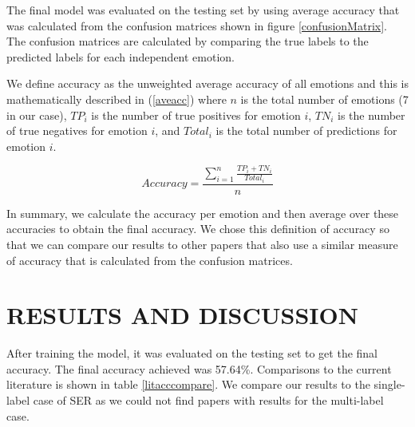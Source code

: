\documentclass[a4paper, 10pt, conference]{ieeeconf}      %
\begin{document}
The final model was evaluated on the testing set by using average accuracy that was calculated from the confusion matrices shown in figure \ref{confusionMatrix}. The confusion matrices are calculated by comparing the true labels to the predicted labels for each independent emotion.

We define accuracy as the unweighted average accuracy of all emotions and this is mathematically described in (\ref{aveacc}) where $n$ is the total number of emotions (7 in our case), $TP_{i}$ is the number of true positives for emotion $i$, $TN_{i}$ is the number of true negatives for emotion $i$, and $Total_{i}$ is the total number of predictions for emotion $i$.

\begin{equation}
	\label{aveacc}
	Accuracy = \frac{\sum_{i=1}^{n}\frac{TP_{i} + TN_{i}}{Total_{i}}}{n}
\end{equation}

In summary, we calculate the accuracy per emotion and then average over these accuracies to obtain the final accuracy. We chose this definition of accuracy so that we can compare our results to other papers that also use a similar measure of accuracy that is calculated from the confusion matrices.

\addtolength{\textheight}{-3cm}   %


\section{RESULTS AND DISCUSSION}

After training the model, it was evaluated on the testing set to get the final accuracy. The final accuracy achieved was 57.64\%. Comparisons to the current literature is shown in table \ref{litacccompare}. We compare our results to the single-label case of SER as we could not find papers with results for the multi-label case.
\end{document}
